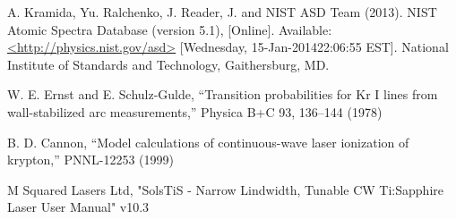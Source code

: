 \documentclass[prb,preprint]{revtex4-1}
\begin{document}
\begin{thebibliography}{2}

 A. Kramida, Yu. Ralchenko, J. Reader, J. and NIST ASD Team (2013). NIST Atomic Spectra Database (version 5.1), [Online]. Available: \url{<http://physics.nist.gov/asd>} [Wednesday, 15-Jan-201422:06:55 EST]. National Institute of Standards and Technology, Gaithersburg, MD.

 W. E. Ernst and E. Schulz-Gulde, ``Transition probabilities for Kr I lines from wall-stabilized arc measurements,'' Physica B+C 93, 136–144 (1978)

 B. D. Cannon, ``Model calculations of continuous-wave laser ionization of krypton,'' PNNL-12253 (1999)

 M Squared Lasers Ltd, "SolsTiS - Narrow Lindwidth, Tunable CW Ti:Sapphire Laser User Manual" v10.3

\end{thebibliography}
\end{document}
